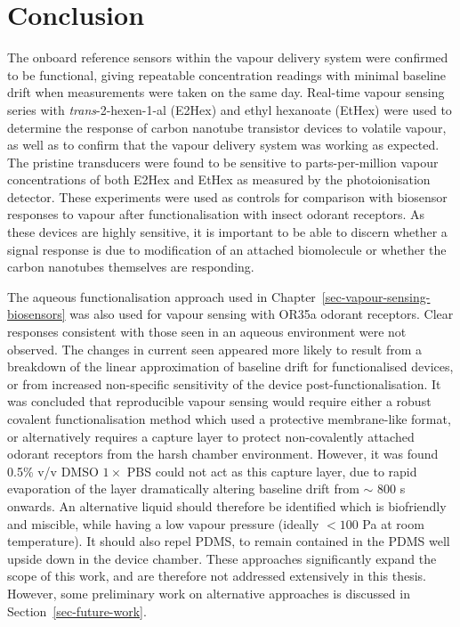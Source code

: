 \documentclass[
  a4paper,
]{scrbook}
\begin{document}
\hypertarget{conclusion-3}{%
\section{Conclusion}\label{conclusion-3}}

The onboard reference sensors within the vapour delivery system were
confirmed to be functional, giving repeatable concentration readings
with minimal baseline drift when measurements were taken on the same
day. Real-time vapour sensing series with \emph{trans}-2-hexen-1-al
(E2Hex) and ethyl hexanoate (EtHex) were used to determine the response
of carbon nanotube transistor devices to volatile vapour, as well as to
confirm that the vapour delivery system was working as expected. The
pristine transducers were found to be sensitive to parts-per-million
vapour concentrations of both E2Hex and EtHex as measured by the
photoionisation detector. These experiments were used as controls for
comparison with biosensor responses to vapour after functionalisation
with insect odorant receptors. As these devices are highly sensitive, it
is important to be able to discern whether a signal response is due to
modification of an attached biomolecule or whether the carbon nanotubes
themselves are responding.

The aqueous functionalisation approach used in
Chapter~\ref{sec-vapour-sensing-biosensors} was also used for vapour
sensing with OR35a odorant receptors. Clear responses consistent with
those seen in an aqueous environment were not observed. The changes in
current seen appeared more likely to result from a breakdown of the
linear approximation of baseline drift for functionalised devices, or
from increased non-specific sensitivity of the device
post-functionalisation. It was concluded that reproducible vapour
sensing would require either a robust covalent functionalisation method
which used a protective membrane-like format, or alternatively requires
a capture layer to protect non-covalently attached odorant receptors
from the harsh chamber environment. However, it was found 0.5\% v/v DMSO
\(1 \times\) PBS could not act as this capture layer, due to rapid
evaporation of the layer dramatically altering baseline drift from
\(\sim\) 800 s onwards. An alternative liquid should therefore be
identified which is biofriendly and miscible, while having a low vapour
pressure (ideally \(< 100\) Pa at room temperature). It should also
repel PDMS, to remain contained in the PDMS well upside down in the
device chamber. These approaches significantly expand the scope of this
work, and are therefore not addressed extensively in this thesis.
However, some preliminary work on alternative approaches is discussed in
Section~\ref{sec-future-work}.
\end{document}
